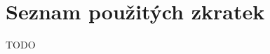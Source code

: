 
\chapter{Seznam pou\v zit\'ych zkratek}

\begin{description}[align=left]
    \item [TODO] TODO
\end{description}
